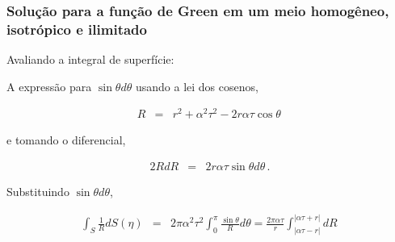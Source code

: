 \documentclass{beamer}
\begin{document}
\begin{frame}
	\frametitle{\textbf{Solu\c{c}\~ao para a fun\c{c}\~ao de Green em um meio homog\^eneo, isotr\'opico e ilimitado}}
	\begin{flushleft}
		\textcolor{red!60!black}{Avaliando a integral de superf\'icie:}
	\end{flushleft}
	
	\begin{flushleft}
		A express\~ao para $\sin \theta d\theta$ usando a lei dos cosenos,
	\end{flushleft}
	\begin{eqnarray}
	\label{ten1}
	R &=&  r^2 + \alpha^2 \tau^2  - 2r\alpha\tau \cos \theta\,
	\end{eqnarray}
	\begin{flushleft}
		e tomando o diferencial,
	\end{flushleft}
	\begin{eqnarray}
	\label{ten1}
	2RdR &=& 2r\alpha\tau \sin \theta d\theta \, .
	\end{eqnarray}
	\begin{flushleft}
		Substituindo $\sin \theta d\theta$,
	\end{flushleft}
	\begin{eqnarray}
	\label{ten1}
	\int_{S} \frac{1}{R} dS(\eta)  &=& 2\pi \alpha^2 \tau^2 \int_{0}^{\pi} \frac{\sin \theta}{R} d\theta  = \frac{2\pi \alpha \tau}{r} \int_{\left| \alpha\tau -r \right|}^{\left| \alpha\tau +r \right|}  dR \, 
	\end{eqnarray}
	
\end{frame}%
\end{document}
